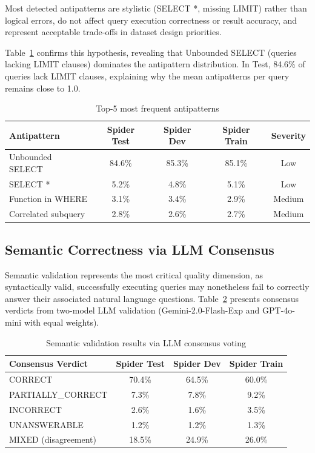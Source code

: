\documentclass[]{einformatica}
\begin{document}
Most detected antipatterns are stylistic (SELECT *, missing LIMIT) rather than logical errors, do not affect query execution correctness or result accuracy, and represent acceptable trade-offs in dataset design priorities.

Table~\ref{tab:antipatterns_top5} confirms this hypothesis, revealing that Unbounded SELECT (queries lacking LIMIT clauses) dominates the antipattern distribution. In Test, 84.6\% of queries lack LIMIT clauses, explaining why the mean antipatterns per query remains close to 1.0.

\begin{table}[ht]
    \caption{Top-5 most frequent antipatterns}
    \label{tab:antipatterns_top5}
    \centering
    \footnotesize
    \begin{tabular}{lcccc}
        \toprule
        \textbf{Antipattern} & \textbf{Spider Test} & \textbf{Spider Dev} & \textbf{Spider Train} & \textbf{Severity} \\
        \midrule
        Unbounded SELECT & 84.6\% & 85.3\% & 85.1\% & Low \\
        SELECT * & 5.2\% & 4.8\% & 5.1\% & Low \\
        Function in WHERE & 3.1\% & 3.4\% & 2.9\% & Medium \\
        Correlated subquery & 2.8\% & 2.6\% & 2.7\% & Medium \\
        \bottomrule
    \end{tabular}
\end{table}

\subsection{Semantic Correctness via LLM Consensus}

Semantic validation represents the most critical quality dimension, as syntactically valid, successfully executing queries may nonetheless fail to correctly answer their associated natural language questions. Table~\ref{tab:semantic} presents consensus verdicts from two-model LLM validation (Gemini-2.0-Flash-Exp and GPT-4o-mini with equal weights).

\begin{table}[ht]
    \caption{Semantic validation results via LLM consensus voting}
    \label{tab:semantic}
    \centering
    \footnotesize
    \begin{tabular}{lccc}
        \toprule
        \textbf{Consensus Verdict} & \textbf{Spider Test} & \textbf{Spider Dev} & \textbf{Spider Train} \\
        \midrule
        CORRECT & 70.4\% & 64.5\% & 60.0\% \\
        PARTIALLY\_CORRECT & 7.3\% & 7.8\% & 9.2\% \\
        INCORRECT & 2.6\% & 1.6\% & 3.5\% \\
        UNANSWERABLE & 1.2\% & 1.2\% & 1.3\% \\
        MIXED (disagreement) & 18.5\% & 24.9\% & 26.0\% \\
        \bottomrule
    \end{tabular}
\end{table}
\end{document}
